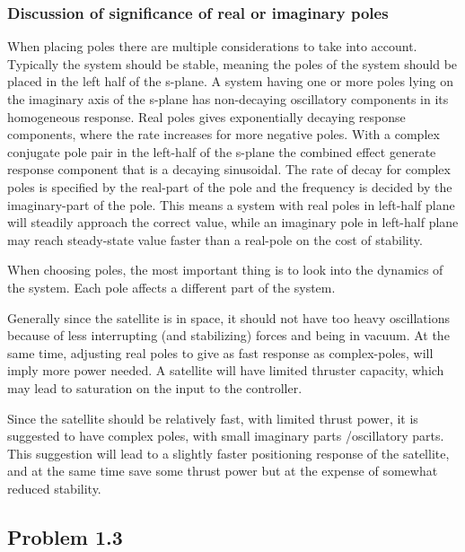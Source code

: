 \subsubsection*{Discussion of significance of real or imaginary poles}

When placing poles there are multiple considerations to take into account. Typically the system should be stable, meaning the poles of the system should be placed in the left half of the s-plane. A system having one or more poles lying on the imaginary axis of the s-plane has non-decaying oscillatory components in its homogeneous response. Real poles gives exponentially decaying response components, where the rate increases for more negative poles. With a complex conjugate pole pair in the left-half of the s-plane the combined effect generate response component that is a decaying sinusoidal. The rate of decay for complex poles is specified by the real-part of the pole and the frequency is decided by the imaginary-part of the pole. This means a system with real poles in left-half plane will steadily approach the correct value, while an imaginary pole in left-half plane may reach steady-state value faster than a real-pole on the cost of stability. 

When choosing poles, the most important thing is to look into the dynamics of the system. Each pole affects a different part of the system.  

Generally since the satellite is in space, it should not have too heavy oscillations because of less interrupting (and stabilizing) forces and being in vacuum. At the same time, adjusting real poles to give as fast response as complex-poles, will imply more power needed. A satellite will have limited thruster capacity, which may lead to saturation on the input to the controller.

Since the satellite should be relatively fast, with limited thrust power, it is suggested to have complex poles, with small imaginary parts /oscillatory parts. This suggestion will lead to a slightly faster positioning response of the satellite, and at the same time save some thrust power but at the expense of somewhat reduced stability.   

\subsection*{Problem 1.3}

